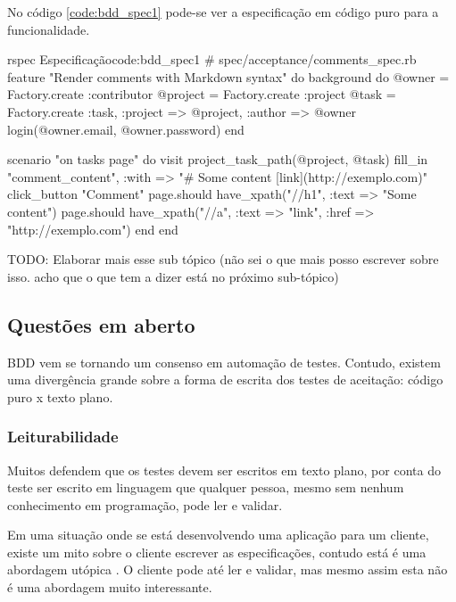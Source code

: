 No código \ref{code:bdd_spec1} pode-se ver a especificação em código puro para a funcionalidade.

\begin{mycode}{rspec}%
{Especificação}{code:bdd_spec1}
# spec/acceptance/comments_spec.rb
feature "Render comments with Markdown syntax" do
  background do
    @owner = Factory.create :contributor
    @project = Factory.create :project
    @task = Factory.create :task, :project => @project, :author => @owner
    login(@owner.email, @owner.password)
  end

  scenario "on tasks page" do
    visit project_task_path(@project, @task)
    fill_in "comment_content", :with => "# Some content [link](http://exemplo.com)"
    click_button "Comment"
    page.should have_xpath("//h1", :text => "Some content")
    page.should have_xpath("//a", :text => "link", :href => "http://exemplo.com")
  end
end
\end{mycode}

TODO: Elaborar mais esse sub tópico (não sei o que mais posso escrever sobre isso. acho que o que tem a dizer está no próximo sub-tópico)



\subsection{Questões em aberto} %
\label{sub:questoes_es_em_aberto_bdd}

BDD vem se tornando um consenso em automação de testes. Contudo, existem uma divergência grande sobre a forma de escrita dos testes de aceitação: código puro x texto plano.

\subsubsection{Leiturabilidade} %
\label{subsub:leiturabilidade}

Muitos defendem que os testes devem ser escritos em texto plano, por conta do teste ser escrito em linguagem que qualquer pessoa, mesmo sem nenhum conhecimento em programação, pode ler e validar.

Em uma situação onde se está desenvolvendo uma aplicação para um cliente, existe um mito sobre o cliente escrever as especificações, contudo está é uma abordagem utópica \cite{SteakOverCucumber, CucumberForVegetarians, ClientsWritingCucumber}. O cliente pode até ler e validar, mas mesmo assim esta não é uma abordagem muito interessante.

